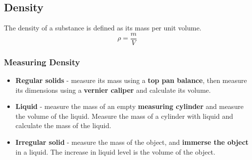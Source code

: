 \subsection{Density}

The density of a substance is defined as its mass per unit volume.
$$\rho=\frac{m}{V}$$

\subsubsection*{Measuring Density}
\begin{itemize}
    \item \textbf{Regular solids} - measure its mass using a \textbf{top pan balance}, then measure its dimensions using a \textbf{vernier caliper} and calculate its volume.
    \item \textbf{Liquid} - measure the mass of an empty \textbf{measuring cylinder} and measure the volume of the liquid. Measure the mass of a cylinder with liquid and calculate the mass of the liquid.
    \item \textbf{Irregular solid} - measure the mass of the object, and \textbf{immerse the object} in a liquid. The increase in liquid level is the volume of the object.
\end{itemize}
